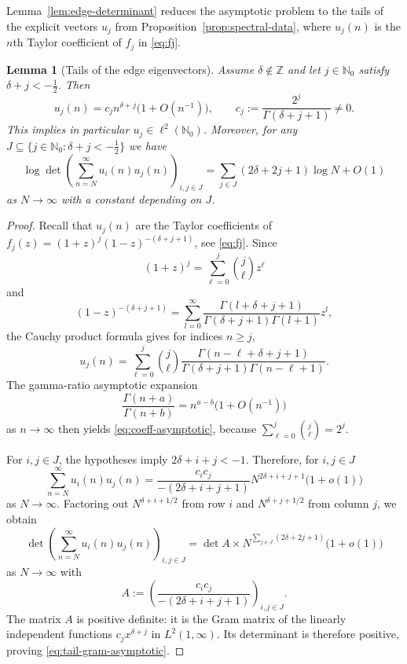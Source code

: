 \documentclass[11pt,a4paper,reqno]{amsart}
\newtheorem{lemma}[theorem]{Lemma}
\theoremstyle{remark}
\newcommand{\Nzero}{\mathbb N_0}
\begin{document}
Lemma~\ref{lem:edge-determinant} reduces the asymptotic
problem to the tails of the explicit vectors $u_j$ from
Proposition~\ref{prop:spectral-data}, where $u_j(n)$ is the $n$th
Taylor coefficient of $f_j$ in \eqref{eq:fj}.

\begin{lemma}[Tails of the edge eigenvectors]\label{lem:eigenvector-tails}
Assume $\delta\notin\mathbb Z$ and let $j\in\Nzero$ satisfy
$\delta+j<-\frac12$.  Then
\begin{equation}\label{eq:coeff-asymptotic}
 u_j(n)
 =c_j n^{\delta+j}\bigl(1+O(n^{-1})\bigr),
 \qquad
 c_j:=\frac{2^j}{\Gamma(\delta+j+1)}\ne0.
\end{equation}
This implies in particular $u_j \in \ell^2(\Nzero)$.
Moreover, for any $J\subseteq\{j\in\Nzero:\delta+j<-\frac12\}$ we have
\begin{equation}\label{eq:tail-gram-asymptotic}
 \log\det\left(\sum_{n=N}^\infty u_i(n)u_j(n)\right)_{i,j\in J}
 =
 \sum_{j\in J}(2\delta+2j+1) \log N + O(1)
\end{equation}
as $N\to\infty$ with a constant depending on $J$.
\end{lemma}

\begin{proof}
Recall that $u_j(n)$ are the Taylor coefficients of $f_j(z) = (1+z)^j(1-z)^{-(\delta+j+1)}$, see \eqref{eq:fj}. Since
\[
 (1+z)^j=\sum_{\ell=0}^j\binom j\ell z^\ell
\]
and
\[
(1-z)^{-(\delta+j+1)} = \sum_{l=0}^\infty \frac {\Gamma(l+\delta+j+1) }{\Gamma(\delta + j+1)\Gamma(l+1)} z^l,
\]
the Cauchy product formula gives for indices $n\ge j$,
\[
 u_j(n)
 =\sum_{\ell=0}^j\binom j\ell
 \frac{\Gamma(n-\ell+\delta+j+1)}
 {\Gamma(\delta+j+1)\Gamma(n-\ell+1)}.
\]
The gamma-ratio asymptotic expansion
\[
 \frac{\Gamma(n+a)}{\Gamma(n+b)}
 =n^{a-b}\bigl(1+O(n^{-1})\bigr)
\]
as $n\to\infty$
then yields \eqref{eq:coeff-asymptotic}, because
$\sum_{\ell=0}^j\binom j\ell=2^j$.

For $i,j\in J$, the hypotheses imply $2\delta+i+j<-1$.  Therefore, for $i,j\in J$
\begin{equation}\label{eq:tail-pairing}
 \sum_{n=N}^\infty u_i(n)u_j(n)
 =\frac{c_ic_j}{-(2\delta+i+j+1)}
 N^{2\delta+i+j+1}\bigl(1+o(1)\bigr)
\end{equation}
as $N\to\infty$.
Factoring out $N^{\delta+i+1/2}$ from row $i$ and
$N^{\delta+j+1/2}$ from column $j$, we obtain
\begin{equation}
    \det\left(\sum_{n=N}^\infty u_i(n)u_j(n)\right)_{i,j\in J}
    = \det A \times
    N^{\sum_{j\in J}(2\delta+2j+1)}\bigl(1+o(1)\bigr)
\end{equation}
as $N\to\infty$ with
\begin{equation}\label{eq:Cauchy-limit}
 A:= \left(\frac{c_ic_j}{-(2\delta+i+j+1)}\right)_{i,j\in J}.
\end{equation}
The matrix $A$ is positive definite: it is the Gram matrix of the linearly
independent functions $c_jx^{\delta+j}$ in $L^2(1,\infty)$.  Its determinant
is therefore positive, proving \eqref{eq:tail-gram-asymptotic}.
\end{proof}
\end{document}
